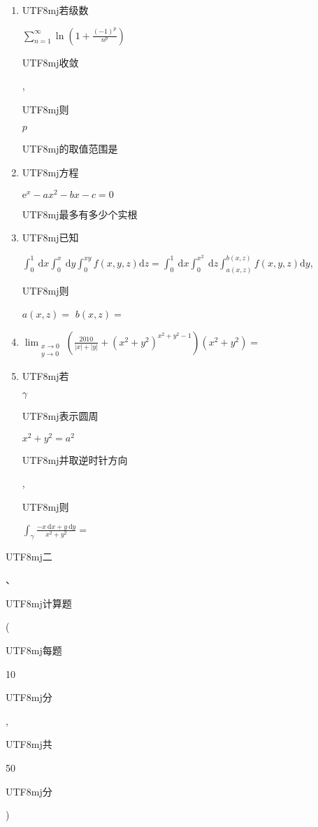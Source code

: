 \documentclass[10pt]{article}
\begin{document}
\begin{enumerate}
  \item \begin{CJK}{UTF8}{mj}若级数\end{CJK} $\sum_{n=1}^{\infty} \ln \left(1+\frac{(-1)^{p}}{n^{p}}\right)$ \begin{CJK}{UTF8}{mj}收敛\end{CJK}, \begin{CJK}{UTF8}{mj}则\end{CJK} $p$ \begin{CJK}{UTF8}{mj}的取值范围是\end{CJK}

  \item \begin{CJK}{UTF8}{mj}方程\end{CJK} $\mathrm{e}^{x}-a x^{2}-b x-c=0$ \begin{CJK}{UTF8}{mj}最多有多少个实根\end{CJK}

  \item \begin{CJK}{UTF8}{mj}已知\end{CJK} $\int_{0}^{1} \mathrm{~d} x \int_{0}^{x} \mathrm{~d} y \int_{0}^{x y} f(x, y, z) \mathrm{d} z=\int_{0}^{1} \mathrm{~d} x \int_{0}^{x^{2}} \mathrm{~d} z \int_{a(x, z)}^{b(x, z)} f(x, y, z) \mathrm{d} y$, \begin{CJK}{UTF8}{mj}则\end{CJK} $a(x, z)=$ $b(x, z)=$

  \item $\lim _{\substack{x \rightarrow 0 \\ y \rightarrow 0}}\left(\frac{2010}{|x|+|y|}+\left(x^{2}+y^{2}\right)^{x^{2}+y^{2}-1}\right)\left(x^{2}+y^{2}\right)=$

  \item \begin{CJK}{UTF8}{mj}若\end{CJK} $\gamma$ \begin{CJK}{UTF8}{mj}表示圆周\end{CJK} $x^{2}+y^{2}=a^{2}$ \begin{CJK}{UTF8}{mj}并取逆时针方向\end{CJK}, \begin{CJK}{UTF8}{mj}则\end{CJK} $\int_{\gamma} \frac{-x \mathrm{~d} x+y \mathrm{~d} y}{x^{2}+y^{2}}=$

\end{enumerate}
\begin{CJK}{UTF8}{mj}二\end{CJK}、\begin{CJK}{UTF8}{mj}计算题\end{CJK}(\begin{CJK}{UTF8}{mj}每题\end{CJK} 10 \begin{CJK}{UTF8}{mj}分\end{CJK}, \begin{CJK}{UTF8}{mj}共\end{CJK} 50 \begin{CJK}{UTF8}{mj}分\end{CJK})
\end{document}
